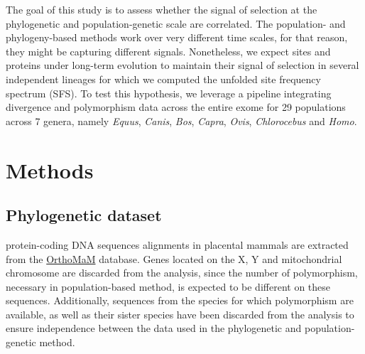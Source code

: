 \documentclass{article}
\begin{document}
    The goal of this study is to assess whether the signal of selection at the phylogenetic and population-genetic scale are correlated.
    The population- and phylogeny-based methods work over very different time scales, for that reason, they might be capturing different signals.
    Nonetheless, we expect sites and proteins under long-term evolution to maintain their signal of selection in several independent lineages for which we computed the unfolded site frequency spectrum (SFS).
    To test this hypothesis, we leverage a pipeline integrating divergence and polymorphism data across the entire exome for 29 populations across 7 genera, namely \textit{Equus}, \textit{Canis}, \textit{Bos}, \textit{Capra}, \textit{Ovis}, \textit{Chlorocebus} and \textit{Homo}.



    \section{Methods}\label{sec:methods}

    \subsection*{Phylogenetic dataset}
    protein-coding DNA sequences alignments in placental mammals are extracted from the \href{https://www.orthomam.univ-montp2.fr}{OrthoMaM} database\cite{ranwez_orthomam_2007, douzery_orthomam_2014, scornavacca_orthomam_2019}.
    Genes located on the X, Y and mitochondrial chromosome are discarded from the analysis, since the number of polymorphism, necessary in population-based method, is expected to be different on these sequences.
    Additionally, sequences from the species for which polymorphism are available, as well as their sister species have been discarded from the analysis to ensure independence between the data used in the phylogenetic and population-genetic method.
\end{document}
